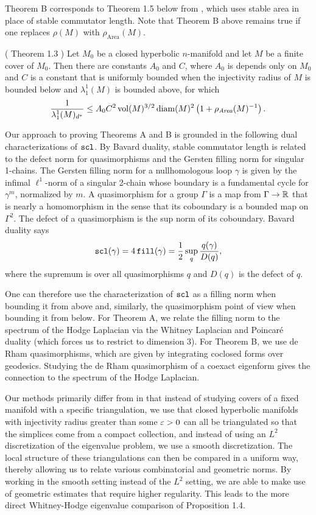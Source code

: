 {Theorem B corresponds to Theorem 1.5 below from \cite{LS}, which uses stable area in place of stable commutator length. Note that Theorem B above remains true if one replaces $\rho(M)$ with $\rho_{\text{Area}}(M)$.

\begin{thm}(\cite{LS} Theorem 1.3 )  Let $M_0$ be a closed hyperbolic $n$-manifold and let $M$ be a finite cover of $M_0.$ Then there are constants $A_0$ and $C$, where $A_0$ is depends only on $M_0$ and $C$ is a constant that is uniformly bounded when the injectivity radius of $M$ is bounded below and $\lambda_1^1(M)$ is bounded above, for which $$\frac{1}{\lambda_1^1(M)_{d^*}}\leq A_0C^2\operatorname{vol}(M)^{3/2}\operatorname{diam}(M)^2 \left(1+\rho_{\emph{Area}}(M)^{-1}\right).$$
\end{thm}

Our approach to proving Theorems A and B is grounded in the following dual characterizations of $\operatorname{{\tt{scl}}}$. By Bavard duality, stable commutator length is related to the defect norm for quasimorphisms and the Gersten filling norm for singular 1-chains. The Gersten filling norm for a nullhomologous loop $\gamma$ is given by the infimal $\ell^1$-norm of a singular 2-chain whose boundary is a fundamental cycle for $\gamma^m$, normalized by $m$. A quasimorphism for a group $\Gamma$ is a map from $\Gamma\to \mathbb R$ that is nearly a homomorphism in the sense that its coboundary is a bounded map on $\Gamma^2$. The defect of a quasimorphism is the sup norm of its coboundary. Bavard duality says $$\operatorname{{\tt{scl}}}(\gamma) = 4\operatorname{{\tt{fill}}}(\gamma) = \frac{1}{2}\sup\limits_q \frac{q(\gamma)}{D(q)},$$ where the supremum is over all quasimorphisms $q$ and $D(q)$ is the defect of $q$.

One can therefore use the characterization of $\operatorname{{\tt{scl}}}$ as a filling norm when bounding it from above and, similarly, the quasimorphism point of view when bounding it from below. For Theorem A, we relate the filling norm to the spectrum of the Hodge Laplacian via the Whitney Laplacian and Poincar\'e duality (which forces us to restrict to dimension 3). For Theorem B, we use de Rham quasimorphisms, which are given by integrating coclosed forms over geodesics. Studying the de Rham quasimorphism of a coexact eigenform gives the connection to the spectrum of the Hodge Laplacian.

Our methods primarily differ from \cite{LS} in that instead of studying covers of a fixed manifold with a specific triangulation, we use that closed hyperbolic manifolds with injectivity radius greater than some $\varepsilon>0$ can all be triangulated so that the simplices come from a compact collection, and instead of using an $L^2$ discretization of the eigenvalue problem, we use a smooth discretization. The local structure of these triangulations can then be compared in a uniform way, thereby allowing us to relate various combinatorial and geometric norms. By working in the smooth setting instead of the $L^2$ setting, we are able to make use of geometric estimates that require higher regularity. This leads to the more direct Whitney-Hodge eigenvalue comparison of Proposition 1.4.

}

